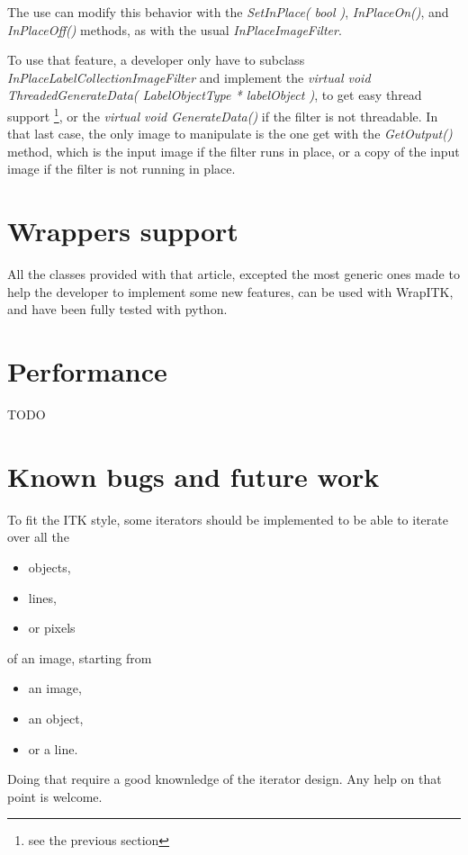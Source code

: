 \documentclass{InsightArticle}
\begin{document}
The use can modify this behavior with the {\em SetInPlace( bool )}, {\em InPlaceOn()}, and {\em InPlaceOff()} methods, as with the usual {\em InPlaceImageFilter}.

To use that feature, a developer only have to subclass {\em InPlaceLabelCollectionImageFilter} and
implement the {\em virtual void ThreadedGenerateData( LabelObjectType * labelObject )}, to get easy thread
support \footnote{see the previous section}, or the {\em virtual void GenerateData()} if the filter is not threadable. In that last case,
the only image to manipulate is the one get with the {\em GetOutput()} method, which is the input image if the filter runs in place, or a copy of the input image if the filter is not running in place.


\section{Wrappers support}

All the classes provided with that article, excepted the most generic ones made
to help the developer to implement some new features, can be used with WrapITK,
and have been fully tested with python.

\section{Performance}

TODO

\section{Known bugs and future work}

To fit the ITK style, some iterators should be implemented to be able to iterate
over all the 
\begin{itemize}
  \item objects,
  \item lines,
  \item or pixels
\end{itemize}

of an image, starting from 
\begin{itemize}
  \item an image,
  \item an object,
  \item or a line.
\end{itemize}

Doing that require a good knownledge of the iterator design. Any help on that point is
welcome.
\end{document}
